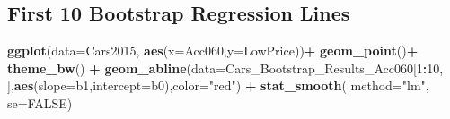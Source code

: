 \documentclass[]{book}
\newenvironment{Shaded}{\begin{snugshade}}{\end{snugshade}}
\newcommand{\KeywordTok}[1]{\textcolor[rgb]{0.13,0.29,0.53}{\textbf{#1}}}
\newcommand{\DataTypeTok}[1]{\textcolor[rgb]{0.13,0.29,0.53}{#1}}
\newcommand{\DecValTok}[1]{\textcolor[rgb]{0.00,0.00,0.81}{#1}}
\newcommand{\StringTok}[1]{\textcolor[rgb]{0.31,0.60,0.02}{#1}}
\newcommand{\OtherTok}[1]{\textcolor[rgb]{0.56,0.35,0.01}{#1}}
\newcommand{\ControlFlowTok}[1]{\textcolor[rgb]{0.13,0.29,0.53}{\textbf{#1}}}
\newcommand{\OperatorTok}[1]{\textcolor[rgb]{0.81,0.36,0.00}{\textbf{#1}}}
\newcommand{\NormalTok}[1]{#1}
\begin{document}
\begin{Shaded}
\end{Shaded}

\subsection{First 10 Bootstrap Regression
Lines}\label{first-10-bootstrap-regression-lines}

\begin{Shaded}
\begin{Highlighting}[]
\KeywordTok{ggplot}\NormalTok{(}\DataTypeTok{data=}\NormalTok{Cars2015, }\KeywordTok{aes}\NormalTok{(}\DataTypeTok{x=}\NormalTok{Acc060,}\DataTypeTok{y=}\NormalTok{LowPrice))}\OperatorTok{+}\StringTok{ }\KeywordTok{geom_point}\NormalTok{()}\OperatorTok{+}
\StringTok{  }\KeywordTok{theme_bw}\NormalTok{()  }\OperatorTok{+}\StringTok{ }
\StringTok{  }\KeywordTok{geom_abline}\NormalTok{(}\DataTypeTok{data=}\NormalTok{Cars_Bootstrap_Results_Acc060[}\DecValTok{1}\OperatorTok{:}\DecValTok{10}\NormalTok{, ],}\KeywordTok{aes}\NormalTok{(}\DataTypeTok{slope=}\NormalTok{b1,}\DataTypeTok{intercept=}\NormalTok{b0),}\DataTypeTok{color=}\StringTok{"red"}\NormalTok{) }\OperatorTok{+}\StringTok{ }
\StringTok{  }\KeywordTok{stat_smooth}\NormalTok{( }\DataTypeTok{method=}\StringTok{"lm"}\NormalTok{, }\DataTypeTok{se=}\OtherTok{FALSE}\NormalTok{)}
\end{Highlighting}
\end{Shaded}
\end{document}
